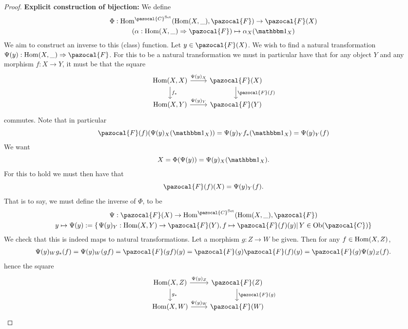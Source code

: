 \begin{proof}
    \textbf{Explicit construction of bijection:}
    We define
    \begin{gather*}
        \Phi : \Hom^{\pazocal{C}^\mathrm{Set}}(\Hom(X,\_),\pazocal{F}) \rightarrow \pazocal{F}(X)\\
        (\alpha : \Hom(X,\_) \Rightarrow \pazocal{F})  \mapsto \alpha_X(\fone_X)
    \end{gather*}
    We aim to construct an inverse to this (class) function. Let $y\in \pazocal{F}(X)$. We wish to find a natural transformation $\Psi(y) : \Hom(X,\_)\Rightarrow \pazocal{F}$. For this to be a natural transformation we must in particular have that for any object $Y$ and any morphism $f: X\rightarrow Y$, it must be that the square 
    $$
        \begin{tikzcd}
            \Hom(X,X) \arrow[r, "\Psi(y)_X"] \arrow[d,"f_\ast"] & \pazocal{F}(X) \arrow[d,"\pazocal{F}(f)"]\\
            \Hom(X,Y) \arrow[r,"\Psi(y)_Y"] & \pazocal{F}(Y)
        \end{tikzcd}    
    $$
    commutes. Note that in particular
    $$
        \pazocal{F}(f)(\Psi(y)_X(\fone_X))= \Psi(y)_Yf_\ast(\fone_X)= \Psi(y)_Y(f)
    $$
    We want 
    $$X= \Phi(\Psi(y)) = \Psi(y)_X(\fone_X).$$
    For this to hold we must then have that 
    $$\pazocal{F}(f)(X) = \Psi(y)_Y(f).$$
    That is to say, we must define the inverse of $\Phi$, to be 
    \begin{gather*}
        \Psi:\pazocal{F}(X)\rightarrow \Hom^{\pazocal{C}^\mathrm{Set}}(\Hom(X,\_),\pazocal{F})\\
        y \mapsto \Psi(y):= \{\left.\Psi(y)_Y : \Hom(X,Y)\rightarrow \pazocal{F}(Y), f\mapsto \pazocal{F}(f)(y)\right| Y\in \Ob(\pazocal{C}) \}
    \end{gather*}
    We check that this is indeed maps to natural transformations. Let a morphism $g: Z\rightarrow W$ be given. Then for any $f\in \mathrm{Hom}(X,Z)$,
    \begin{align*}
        \Psi(y)_Wg_\ast(f) = \Psi(y)_W(gf) =\pazocal{F}(gf)(y)=\pazocal{F}(g)\pazocal{F}(f)(y) = \pazocal{F}(g)\Psi(y)_Z(f).
    \end{align*}
    hence the square
    $$
        \begin{tikzcd}
            \Hom(X,Z) \arrow[r,"\Psi(y)_Z"]\arrow[d,"g_\ast"] & \pazocal{F}(Z)\arrow[d,"\pazocal{F}(g)"] \\
            \Hom(X,W) \arrow[r,"\Psi(y)_W"] & \pazocal{F}(W)
        \end{tikzcd}
$$
\end{proof}
